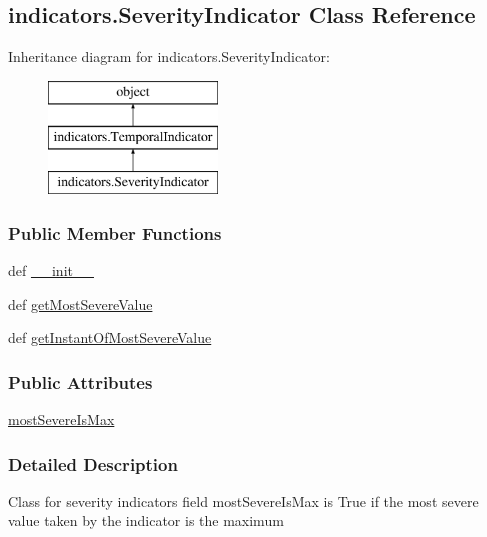 \hypertarget{classindicators_1_1SeverityIndicator}{\subsection{indicators.\-Severity\-Indicator Class Reference}
\label{classindicators_1_1SeverityIndicator}
}
Inheritance diagram for indicators.\-Severity\-Indicator\-:\begin{figure}[H]
\begin{center}
\leavevmode
\includegraphics[height=3.000000cm]{classindicators_1_1SeverityIndicator}
\end{center}
\end{figure}
\subsubsection*{Public Member Functions}
\begin{DoxyCompactItemize}
\item 
def \hyperlink{classindicators_1_1SeverityIndicator_a16df3a5bbf8ae28fa903d1a5623f343f}{\-\_\-\-\_\-init\-\_\-\-\_\-}
\item 
def \hyperlink{classindicators_1_1SeverityIndicator_a0556b024557304f2a3e2fe615359969d}{get\-Most\-Severe\-Value}
\item 
def \hyperlink{classindicators_1_1SeverityIndicator_a28f4188cf8bc41a6ef5fc0bcc2e9b360}{get\-Instant\-Of\-Most\-Severe\-Value}
\end{DoxyCompactItemize}
\subsubsection*{Public Attributes}
\begin{DoxyCompactItemize}
\item 
\hyperlink{classindicators_1_1SeverityIndicator_a1a5a8c44a3d8b839ccf791172508b9bb}{most\-Severe\-Is\-Max}
\end{DoxyCompactItemize}


\subsubsection{Detailed Description}
\begin{DoxyVerb}Class for severity indicators 
field mostSevereIsMax is True 
if the most severe value taken by the indicator is the maximum\end{DoxyVerb}
 

